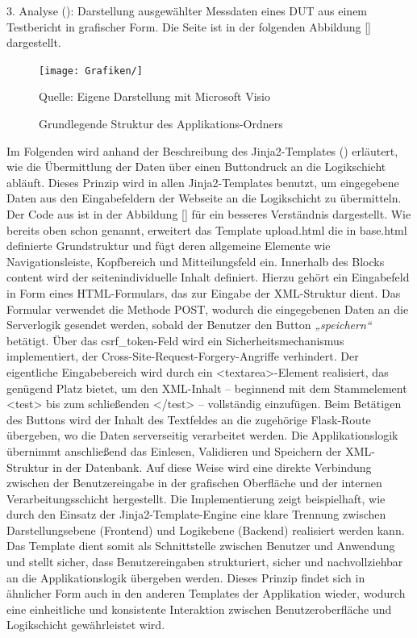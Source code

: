 3. Analyse (): Darstellung ausgewählter Messdaten eines DUT aus einem Testbericht in grafischer Form.
Die Seite ist in der folgenden Abbildung \ref{} dargestellt.

\begin{figure}[H]
    \centering
    \texttt{[image: Grafiken/]}
    \caption{Grundlegende Struktur des Applikations-Ordners}
    \label{fig: }
    {Quelle: Eigene Darstellung mit Microsoft Visio}
\end{figure}

Im Folgenden wird anhand der Beschreibung des Jinja2-Templates () erläutert, wie die Übermittlung der Daten über einen Buttondruck an die Logikschicht abläuft.
Dieses Prinzip wird in allen Jinja2-Templates benutzt, um eingegebene Daten aus den Eingabefeldern der Webseite an die Logikschicht zu übermitteln.
Der Code aus  ist in der Abbildung \ref{} für ein besseres Verständnis dargestellt.
Wie bereits oben schon genannt, erweitert das Template upload.html die in base.html definierte Grundstruktur und fügt deren allgemeine Elemente wie Navigationsleiste, Kopfbereich und Mitteilungsfeld ein.
Innerhalb des Blocks content wird der seitenindividuelle Inhalt definiert.
Hierzu gehört ein Eingabefeld in Form eines HTML-Formulars, das zur Eingabe der XML-Struktur dient.
Das Formular verwendet die Methode POST, wodurch die eingegebenen Daten an die Serverlogik gesendet werden, sobald der Benutzer den Button \textit{„speichern“} betätigt.
Über das csrf\_token-Feld wird ein Sicherheitsmechanismus implementiert, der Cross-Site-Request-Forgery-Angriffe verhindert.
Der eigentliche Eingabebereich wird durch ein <textarea>-Element realisiert, das genügend Platz bietet, um den XML-Inhalt – beginnend mit dem Stammelement <test> bis zum schließenden </test> – vollständig einzufügen.
Beim Betätigen des Buttons wird der Inhalt des Textfeldes an die zugehörige Flask-Route übergeben, wo die Daten serverseitig verarbeitet werden.
Die Applikationslogik übernimmt anschließend das Einlesen, Validieren und Speichern der XML-Struktur in der Datenbank.
Auf diese Weise wird eine direkte Verbindung zwischen der Benutzereingabe in der grafischen Oberfläche und der internen Verarbeitungsschicht hergestellt.
Die Implementierung zeigt beispielhaft, wie durch den Einsatz der Jinja2-Template-Engine eine klare Trennung zwischen Darstellungsebene (Frontend) und Logikebene (Backend) realisiert werden kann.
Das Template dient somit als Schnittstelle zwischen Benutzer und Anwendung und stellt sicher, dass Benutzereingaben strukturiert, sicher und nachvollziehbar an die Applikationslogik übergeben werden.
Dieses Prinzip findet sich in ähnlicher Form auch in den anderen Templates der Applikation wieder, wodurch eine einheitliche und konsistente Interaktion zwischen Benutzeroberfläche und Logikschicht gewährleistet wird.





